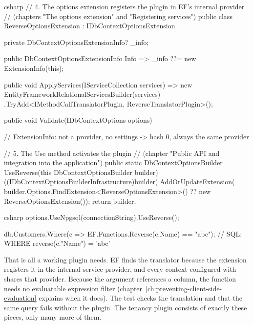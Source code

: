 \begin{sourcecode}{csharp}
// 4. The options extension registers the plugin in EF's internal provider
//    (chapters "The options extension" and "Registering services")
public class ReverseOptionsExtension : IDbContextOptionsExtension
{
    private DbContextOptionsExtensionInfo? _info;

    public DbContextOptionsExtensionInfo Info => _info ??= new ExtensionInfo(this);

    public void ApplyServices(IServiceCollection services)
        => new EntityFrameworkRelationalServicesBuilder(services)
            .TryAdd<IMethodCallTranslatorPlugin, ReverseTranslatorPlugin>();

    public void Validate(IDbContextOptions options)
    {
    }

    // ExtensionInfo: not a provider, no settings -> hash 0, always the same provider
}

// 5. The Use method activates the plugin
//    (chapter "Public API and integration into the application")
public static DbContextOptionsBuilder UseReverse(this DbContextOptionsBuilder builder)
{
    ((IDbContextOptionsBuilderInfrastructure)builder).AddOrUpdateExtension(
        builder.Options.FindExtension<ReverseOptionsExtension>()
        ?? new ReverseOptionsExtension());
    return builder;
}
\end{sourcecode}

\begin{sourcecode}[Usage]{csharp}
options.UseNpgsql(connectionString).UseReverse();

db.Customers.Where(c => EF.Functions.Reverse(c.Name) == "abc");
// SQL: WHERE reverse(c."Name") = 'abc'
\end{sourcecode}

That is all a working plugin needs. EF finds the translator because the extension registers
it in the internal service provider, and every context configured with
 shares that provider. Because the argument
references a column, the function needs no evaluatable expression filter
(chapter~\ref{ch:preventing-client-side-evaluation} explains when it does). The test
 checks the translation and that the same
query fails without the plugin. The tenancy plugin consists of exactly these pieces, only
many more of them.

